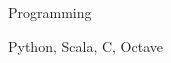 \begin{cventries}
  \cventry
    {Programming}
    {}
    {}
    {}
    {
      \begin{cvitems}
        \item {Python, Scala, C, Octave}
      \end{cvitems}
    }
\end{cventries}
